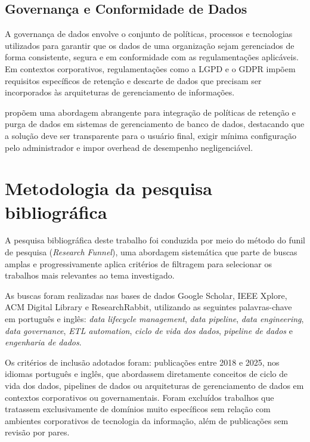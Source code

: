 \documentclass[
    12pt,                %
    openright,           %
    oneside,             %
    a4paper,             %
    english,             %
    brazil               %
]{abntex2}
\begin{document}
\subsection{Governança e Conformidade de Dados}

A governança de dados envolve o conjunto de políticas, processos e tecnologias utilizados para garantir que os dados de uma organização sejam gerenciados de forma consistente, segura e em conformidade com as regulamentações aplicáveis. Em contextos corporativos, regulamentações como a LGPD e o GDPR impõem requisitos específicos de retenção e descarte de dados que precisam ser incorporados às arquiteturas de gerenciamento de informações.

 propõem uma abordagem abrangente para integração de políticas de retenção e purga de dados em sistemas de gerenciamento de banco de dados, destacando que a solução deve ser transparente para o usuário final, exigir mínima configuração pelo administrador e impor overhead de desempenho negligenciável.

\section{Metodologia da pesquisa bibliográfica}
\label{sec:metodologia_pesquisa}

A pesquisa bibliográfica deste trabalho foi conduzida por meio do método do funil de pesquisa (\textit{Research Funnel}), uma abordagem sistemática que parte de buscas amplas e progressivamente aplica critérios de filtragem para selecionar os trabalhos mais relevantes ao tema investigado.

As buscas foram realizadas nas bases de dados Google Scholar, IEEE Xplore, ACM Digital Library e ResearchRabbit, utilizando as seguintes palavras-chave em português e inglês: \textit{data lifecycle management}, \textit{data pipeline}, \textit{data engineering}, \textit{data governance}, \textit{ETL automation}, \textit{ciclo de vida dos dados}, \textit{pipeline de dados} e \textit{engenharia de dados}.

Os critérios de inclusão adotados foram: publicações entre 2018 e 2025, nos idiomas português e inglês, que abordassem diretamente conceitos de ciclo de vida dos dados, pipelines de dados ou arquiteturas de gerenciamento de dados em contextos corporativos ou governamentais. Foram excluídos trabalhos que tratassem exclusivamente de domínios muito específicos sem relação com ambientes corporativos de tecnologia da informação, além de publicações sem revisão por pares.
\end{document}
